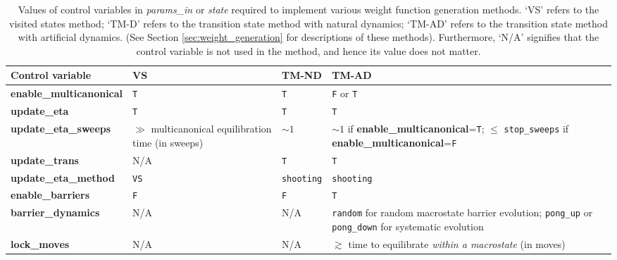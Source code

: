 \documentclass{report}
\begin{document}
\begin{landscape}
\begin{table}\label{table:wf_gen_variables}
\begin{center}
\begin{tabular}{l p{4cm} p{2cm} p{6cm}}
Control variable                   & VS                & TM-ND                & TM-AD \\
\hline 
\textbf{enable\_multicanonical}    & \texttt{T}        &   \texttt{T}         &  \texttt{F} or \texttt{T}   \\
\textbf{update\_eta}               & \texttt{T}        &   \texttt{T}         &  \texttt{T}                 \\
\textbf{update\_eta\_sweeps}       & $\gg$ multicanonical equilibration time (in sweeps)  & $\sim 1$ &   $\sim 1$ if \textbf{enable\_multicanonical}=\texttt{T}; 
   $\leq$ \texttt{stop\_sweeps} if \textbf{enable\_multicanonical}=\texttt{F} \\
\textbf{update\_trans}             & N/A               &   \texttt{T}         &  \texttt{T}                 \\
\textbf{update\_eta\_method}       & \texttt{VS}       &   \texttt{shooting}  &  \texttt{shooting}     \\
\textbf{enable\_barriers}          & \texttt{F}        &   \texttt{F}         &  \texttt{T}                 \\
\textbf{barrier\_dynamics}         & N/A               &   N/A                &  \texttt{random} for random macrostate barrier evolution;
    \texttt{pong\_up} or \texttt{pong\_down} for systematic evolution  \\
\textbf{lock\_moves}               & N/A               &   N/A                &  $\gtrsim$ time to equilibrate \emph{within a macrostate} (in moves) \\
\end{tabular}
\end{center}
\caption{Values of control variables in \emph{params\_in} or \emph{state} required to implement various weight function generation methods.
`VS' refers to the visited states method; `TM-D' refers to the transition state method with natural dynamics; `TM-AD' refers to the
transition state method with artificial dynamics. (See Section 
\ref{sec:weight_generation} for descriptions of these methods). Furthermore, `N/A' signifies that the control variable is not used in the
method, and hence its value does not matter.}
\end{table}
\end{landscape}
\end{document}
